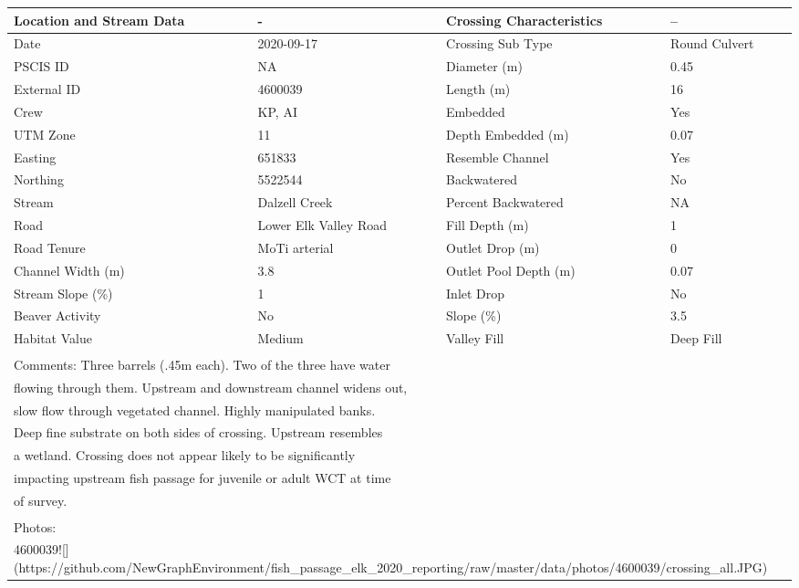 \documentclass[
]{book}
\begin{document}
\begin{tabular}{l|l|l|l}
\hline
Location and Stream Data & - & Crossing Characteristics & --\\
\hline
Date & 2020-09-17 & Crossing Sub Type & Round Culvert\\
\hline
PSCIS ID & NA & Diameter (m) & 0.45\\
\hline
External ID & 4600039 & Length (m) & 16\\
\hline
Crew & KP, AI & Embedded & Yes\\
\hline
UTM Zone & 11 & Depth Embedded (m) & 0.07\\
\hline
Easting & 651833 & Resemble Channel & Yes\\
\hline
Northing & 5522544 & Backwatered & No\\
\hline
Stream & Dalzell Creek & Percent Backwatered & NA\\
\hline
Road & Lower Elk Valley Road & Fill Depth (m) & 1\\
\hline
Road Tenure & MoTi arterial & Outlet Drop (m) & 0\\
\hline
Channel Width (m) & 3.8 & Outlet Pool Depth (m) & 0.07\\
\hline
Stream Slope (\%) & 1 & Inlet Drop & No\\
\hline
Beaver Activity & No & Slope (\%) & 3.5\\
\hline
Habitat Value & Medium & Valley Fill & Deep Fill\\
\hline
\multicolumn{4}{l}{\textsuperscript{} Comments: Three barrels (.45m each). Two of the three have water}\\
\multicolumn{4}{l}{flowing through them. Upstream and downstream channel widens out,}\\
\multicolumn{4}{l}{slow flow through vegetated channel. Highly manipulated banks.}\\
\multicolumn{4}{l}{Deep fine substrate on both sides of crossing. Upstream resembles}\\
\multicolumn{4}{l}{a wetland. Crossing does not appear likely to be significantly}\\
\multicolumn{4}{l}{impacting upstream fish passage for juvenile or adult WCT at time}\\
\multicolumn{4}{l}{of survey.}\\
\multicolumn{4}{l}{\textsuperscript{} Photos:}\\
\multicolumn{4}{l}{4600039![](https://github.com/NewGraphEnvironment/fish\_passage\_elk\_2020\_reporting/raw/master/data/photos/4600039/crossing\_all.JPG)}\\
\end{tabular}
\end{document}
